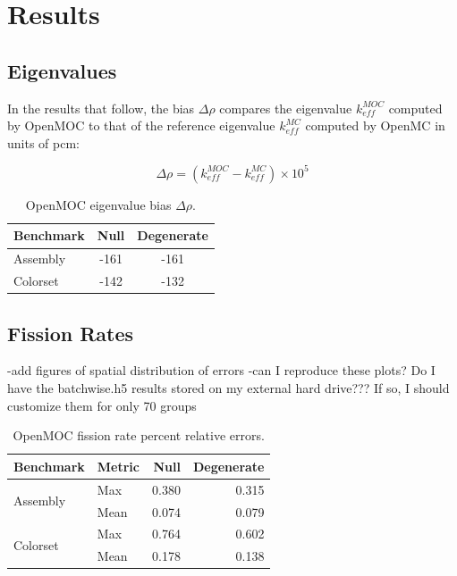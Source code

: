 \section{Results}
\label{sec:results}


\subsection{Eigenvalues}
\label{subsec:eigenvalues}

In the results that follow, the bias $\Delta\rho$ compares the eigenvalue $k_{eff}^{MOC}$ computed by OpenMOC to that of the reference eigenvalue $k_{eff}^{MC}$ computed by OpenMC in units of pcm:

\begin{equation}
\label{eqn:delta-rho}
\Delta\rho = \left(k_{eff}^{MOC} - k_{eff}^{MC}\right) \times 10^{5}
\end{equation}

\begin{table}[h!]
  \centering
  \caption{OpenMOC eigenvalue bias $\Delta\rho$.}
  \label{tab:keff-bias} 
  \begin{tabular}{l c c}
  \toprule
  \textbf{Benchmark} & \textbf{Null} & \textbf{Degenerate} \\
  \midrule
  Assembly & -161 & -161 \\
  Colorset & -142 & -132 \\
  \bottomrule
\end{tabular}
\end{table}


\subsection{Fission Rates}
\label{subsec:fiss-rates}

-add figures of spatial distribution of errors
-can I reproduce these plots? Do I have the batchwise.h5 results stored on my external hard drive??? If so, I should customize them for only 70 groups

\begin{table}[h!]
  \centering
  \caption{OpenMOC fission rate percent relative errors.}
  \label{tab:fiss-errors}
  \begin{tabular}{l l r r}
  \toprule
  \textbf{Benchmark} & \textbf{Metric} & \textbf{Null} & \textbf{Degenerate} \\
  \midrule
  \multirow{2}{*}{Assembly} & Max  & 0.380 & 0.315 \\
                            & Mean & 0.074 & 0.079 \\
  \midrule
  \multirow{2}{*}{Colorset} & Max  & 0.764 & 0.602 \\
                            & Mean & 0.178 & 0.138 \\
  \bottomrule
\end{tabular}
\end{table}


